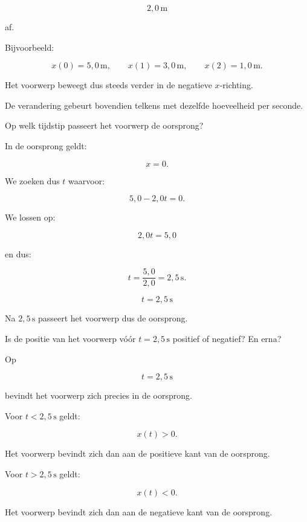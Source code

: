 \documentclass{ximera}
\begin{document}
\begin{oefening}{\oefB\ESS}
\begin{question}
\begin{oplossing}
  \[
  2{,}0\,\mathrm{m}
  \]
  
  af.
  
  Bijvoorbeeld:
  
  \[
  x(0)=5{,}0\,\mathrm{m},
  \qquad
  x(1)=3{,}0\,\mathrm{m},
  \qquad
  x(2)=1{,}0\,\mathrm{m}.
  \]
  
  Het voorwerp beweegt dus steeds verder in de negatieve $x$-richting.
  
  De verandering gebeurt bovendien telkens met dezelfde hoeveelheid per
  seconde.
  \end{oplossing}
  \end{question}
  
  
  \begin{question}
  Op welk tijdstip passeert het voorwerp de oorsprong?
  
  \begin{oplossing}
  In de oorsprong geldt:
  
  \[
  x=0.
  \]
  
  We zoeken dus $t$ waarvoor:
  
  \[
  5{,}0-2{,}0t=0.
  \]
  
  We lossen op:
  
  \[
  2{,}0t=5{,}0
  \]
  
  en dus:
  
  \[
  t=\frac{5{,}0}{2{,}0}
  =
  2{,}5\,\mathrm{s}.
  \]
  
  \[
  \boxed{t=2{,}5\,\mathrm{s}}
  \]
  
  Na $2{,}5\,\mathrm{s}$ passeert het voorwerp dus de oorsprong.
  \end{oplossing}
  \end{question}
  
  
  \begin{question}
  Is de positie van het voorwerp vóór $t=2{,}5\,\mathrm{s}$ positief of
  negatief? En erna?
  
  \begin{oplossing}
  Op
  
  \[
  t=2{,}5\,\mathrm{s}
  \]
  
  bevindt het voorwerp zich precies in de oorsprong.
  
  Voor $t<2{,}5\,\mathrm{s}$ geldt:
  
  \[
  x(t)>0.
  \]
  
  Het voorwerp bevindt zich dan aan de positieve kant van de oorsprong.
  
  Voor $t>2{,}5\,\mathrm{s}$ geldt:
  
  \[
  x(t)<0.
  \]
  
  Het voorwerp bevindt zich dan aan de negatieve kant van de oorsprong.
  \end{oplossing}
  \end{question}
  
  \end{oefening}
  
\end{document}
